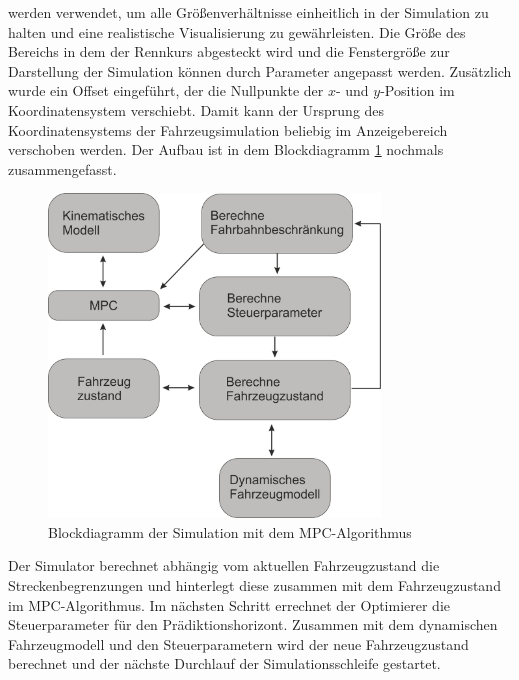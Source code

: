 \documentclass{like}
\begin{document}
werden verwendet, um alle Größenverhältnisse einheitlich in der Simulation zu halten und eine realistische Visualisierung zu gewährleisten. 
Die Größe des Bereichs in dem der Rennkurs abgesteckt wird und die Fenstergröße zur Darstellung der Simulation können durch Parameter angepasst werden. Zusätzlich wurde ein Offset eingeführt, der die Nullpunkte der \(x\)- und \(y\)-Position im Koordinatensystem verschiebt. Damit kann der Ursprung des Koordinatensystems der Fahrzeugsimulation beliebig im Anzeigebereich verschoben werden. 
Der Aufbau ist in dem Blockdiagramm \ref{fig:block_diagram_sim} nochmals zusammengefasst. 
\begin{figure}[ht!]
	\centering
	\includegraphics[width=250pt]{Abbildungen/MPCSimulation.png}
	\caption{Blockdiagramm der Simulation mit dem \ac{MPC}-Algorithmus}
	\label{fig:block_diagram_sim}
\end{figure}
Der Simulator berechnet abhängig vom aktuellen Fahrzeugzustand die Streck\-en\-be\-gren\-zung\-en und hinterlegt diese zusammen mit dem Fahrzeugzustand im \ac{MPC}-Algorithmus. Im nächsten Schritt errechnet der Optimierer die Steuerparameter für den Prädiktionshorizont. Zusammen mit dem dynamischen Fahrzeugmodell und den Steuerparametern wird der neue Fahrzeugzustand berechnet und der nächste Durchlauf der Simulationsschleife gestartet.
\end{document}
